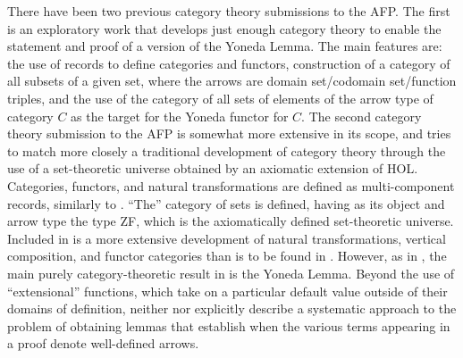 \documentclass[11pt,notitlepage,a4paper]{report}
\begin{document}
There have been two previous category theory submissions to the AFP.
The first \cite{OKeefe-AFP05} is an exploratory work that develops just enough
category theory to enable the statement and proof of a version of the Yoneda Lemma.
The main features are: the use of records to define categories and functors,
construction of a category of all subsets of a given set, where the arrows are
domain set/codomain set/function triples, and the use of the category
of all sets of elements of the arrow type of category $C$ as the target for the
Yoneda functor for $C$.
The second category theory submission to the AFP \cite{Katovsky-AFP10} is somewhat
more extensive in its scope, and tries to match more closely a traditional development
of category theory through the use of a set-theoretic universe obtained by an
axiomatic extension of HOL.  Categories, functors, and natural transformations
are defined as multi-component records, similarly to \cite{OKeefe-AFP05}.
``The'' category of sets is defined, having as its object and arrow type the type ZF,
which is the axiomatically defined set-theoretic universe.
Included in \cite{Katovsky-AFP10} is a more extensive development of natural
transformations, vertical composition, and functor categories than is to be found in
\cite{OKeefe-AFP05}.  However, as in \cite{OKeefe-AFP05}, the main purely category-theoretic
result in \cite{Katovsky-AFP10} is the Yoneda Lemma.
Beyond the use of ``extensional'' functions, which take on a particular default value
outside of their domains of definition, neither \cite{OKeefe-AFP05} nor \cite{Katovsky-AFP10}
explicitly describe a systematic approach to the problem of obtaining lemmas that
establish when the various terms appearing in a proof denote well-defined arrows.
\end{document}
